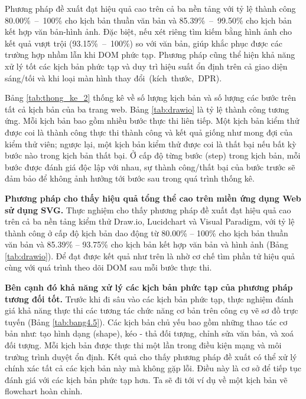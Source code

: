 \documentclass[a4paper, 12pt]{report}
\begin{document}
{Phương pháp đề xuất đạt hiệu quả cao trên cả ba nền tảng với tỷ lệ thành công 80.00\%~--~100\% cho kịch bản thuần văn bản và 85.39\%~--~99.50\% cho kịch bản kết hợp văn bản-hình ảnh. Đặc biệt, nếu xét riêng tìm kiếm bằng hình ảnh cho kết quả vượt trội (93.15\%~--~100\%) so với văn bản, giúp khắc phục được các trường hợp nhầm lẫn khi DOM phức tạp. Phương pháp cũng thể hiện khả năng xử lý tốt các kịch bản phức tạp và duy trì hiệu suất ổn định trên cả giao diện sáng/tối và khi loại màn hình thay đổi~(kích~thước,~DPR).



Bảng \ref{tab:thong_ke_2} thống kê về số lượng kịch bản và số lượng các bước trên tất cả kịch bản của ba trang web. Bảng \ref{tab:drawio} là tỷ lệ thành công tương ứng. Mỗi kịch bản bao gồm nhiều bước thực thi liên tiếp. Một kịch bản kiểm thử được coi là thành công thực thi thành công và kết quả giống như mong đợi của kiểm thử viên; ngược lại, một kịch bản kiểm thử được coi là thất bại nếu bất kỳ bước nào trong kịch bản thất bại. Ở cấp độ từng bước (step) trong kịch bản, mỗi bước được đánh giá độc lập với nhau, sự thành công/thất bại của bước trước sẽ đảm bảo để không ảnh hưởng tới bước sau trong quá trình thống kê. 




\textbf{Phương pháp cho thấy hiệu quả tổng thể cao trên miền ứng dụng Web sử dụng SVG.}
Thực nghiệm cho thấy phương pháp đề xuất đạt hiệu quả cao trên cả ba nền tảng kiểm thử Draw.io, Lucidchart và Visual Paradigm, với tỷ lệ thành công ở cấp độ kịch bản dao động từ 80.00\% -- 100\% cho kịch bản thuần văn bản và 85.39\% -- 93.75\% cho kịch bản kết hợp văn bản và hình ảnh (Bảng \ref{tab:drawio}). Để đạt được kết quả như trên là nhờ cơ chế tìm phần tử hiệu quả cùng với quá trình theo dõi DOM sau mỗi bước thực thi.




\textbf{Bên cạnh đó khả năng xử lý các kịch bản phức tạp của phương pháp tương đối tốt.} Trước khi đi sâu vào các kịch bản phức tạp, thực nghiệm đánh giá khả năng thực thi các tương tác chức năng cơ bản trên công cụ vẽ sơ đồ trực tuyến (Bảng \ref{tab:bang4.5}). Các kịch bản chủ yếu bao gồm những thao tác cơ bản như: tạo hình dạng (shape), kéo - thả đối tượng, chỉnh sửa văn bản, và xoá đối tượng. Mỗi kịch bản được thực thi một lần trong điều kiện mạng và môi trường trình duyệt ổn định. Kết quả cho thấy phương pháp đề xuất có thể xử lý chính xác tất cả các kịch bản này mà không gặp lỗi. Điều này là cơ sở để tiếp tục đánh giá với các kịch bản phức tạp hơn. Ta sẽ đi tới ví dụ về một kịch bản vẽ flowchart hoàn chỉnh.

}
\end{document}

